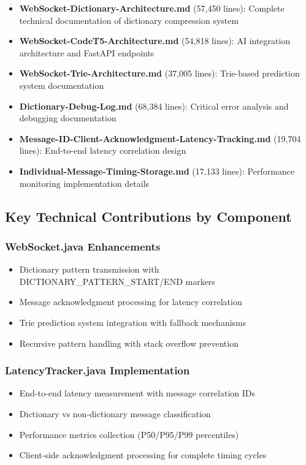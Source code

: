 \documentclass[12pt,a4paper]{article}
\begin{document}
\begin{itemize}
    \item \textbf{WebSocket-Dictionary-Architecture.md} (57,450 lines): Complete technical documentation of dictionary compression system
    \item \textbf{WebSocket-CodeT5-Architecture.md} (54,818 lines): AI integration architecture and FastAPI endpoints
    \item \textbf{WebSocket-Trie-Architecture.md} (37,005 lines): Trie-based prediction system documentation
    \item \textbf{Dictionary-Debug-Log.md} (68,384 lines): Critical error analysis and debugging documentation
    \item \textbf{Message-ID-Client-Acknowledgment-Latency-Tracking.md} (19,704 lines): End-to-end latency correlation design
    \item \textbf{Individual-Message-Timing-Storage.md} (17,133 lines): Performance monitoring implementation details
\end{itemize}

\subsection{Key Technical Contributions by Component}

\subsubsection{WebSocket.java Enhancements}
\begin{itemize}
    \item Dictionary pattern transmission with DICTIONARY\_PATTERN\_START/END markers
    \item Message acknowledgment processing for latency correlation
    \item Trie prediction system integration with fallback mechanisms
    \item Recursive pattern handling with stack overflow prevention
\end{itemize}

\subsubsection{LatencyTracker.java Implementation}
\begin{itemize}
    \item End-to-end latency measurement with message correlation IDs
    \item Dictionary vs non-dictionary message classification
    \item Performance metrics collection (P50/P95/P99 percentiles)
    \item Client-side acknowledgment processing for complete timing cycles
\end{itemize}
\end{document}
